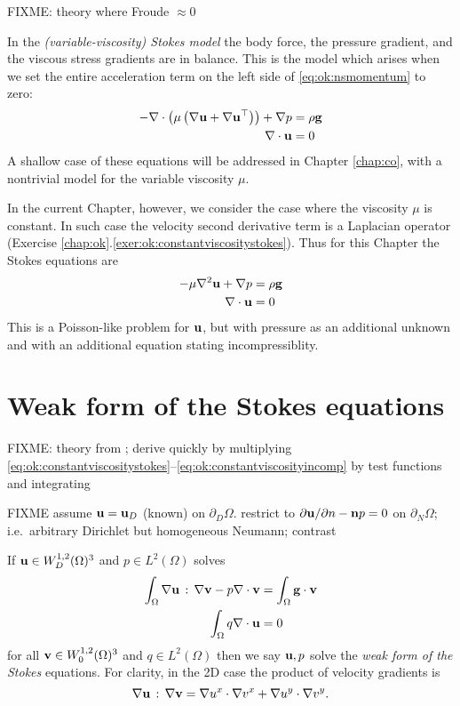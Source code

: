 FIXME: theory where Froude $\approx 0$

In the \emph{(variable-viscosity) Stokes model} the body force, the pressure gradient, and the viscous stress gradients are in balance.  This is the model which arises when we set the entire acceleration term on the left side of \eqref{eq:ok:nsmomentum} to zero:
\begin{align}
- \nabla\cdot \left(\mu \left(\nabla \mathbf{u} + \nabla \mathbf{u}^{\top}\right)\right) + \nabla p &= \rho \mathbf{g} \label{eq:ok:varstokesmomentum} \\
\nabla\cdot \mathbf{u} &= 0 \label{eq:ok:varstokesincomp}
\end{align}
A shallow case of these equations will be addressed in Chapter \ref{chap:co}, with a nontrivial model for the variable viscosity $\mu$.

In the current Chapter, however, we consider the case where the viscosity $\mu$ is constant.  In such case the velocity second derivative term is a Laplacian operator (Exercise \ref{chap:ok}.\ref{exer:ok:constantviscositystokes}).  Thus for this Chapter the Stokes equations are
\begin{align}
- \mu \nabla^2 \mathbf{u} + \nabla p &= \rho \mathbf{g}  \label{eq:ok:constantviscositystokes} \\
\nabla\cdot \mathbf{u} &= 0  \label{eq:ok:constantviscosityincomp}
\end{align}
This is a Poisson-like problem for $\mathbf{u}$, but with pressure as an additional unknown and with an additional equation stating incompressiblity.

\section{Weak form of the Stokes equations}

FIXME: theory from \citep{Braess2007,Elmanetal2005}; derive quickly by multiplying \eqref{eq:ok:constantviscositystokes}--\eqref{eq:ok:constantviscosityincomp} by test functions and integrating

FIXME assume $\mathbf{u}=\mathbf{u}_D$ (known) on $\partial_D\Omega$.  restrict to $\partial \mathbf{u}/\partial n - \mathbf{n} p = 0$ on $\partial_N\Omega$; i.e.~arbitrary Dirichlet but homogeneous Neumann; contrast \citep{Elmanetal2005}

If $\mathbf{u} \in W_D^{1,2}(\Omega)^3$ and $p \in L^2(\Omega)$ solves
\begin{align}
\int_\Omega \nabla \mathbf{u} \,:\, \nabla \mathbf{v} - p \nabla\cdot \mathbf{v} &= \int_\Omega \mathbf{g} \cdot \mathbf{v} \label{eq:ok:weakstokesvelocity} \\
\int_\Omega q \nabla\cdot \mathbf{u} &= 0 \label{eq:ok:weakstokespressure}
\end{align}
for all $\mathbf{v} \in W_0^{1,2}(\Omega)^3$ and $q \in L^2(\Omega)$ then we say $\mathbf{u},p$ solve the \emph{weak form of the Stokes} equations.  For clarity, in the 2D case the product of velocity gradients is
     $$\nabla \mathbf{u} \,:\, \nabla \mathbf{v} = \nabla u^x \cdot \nabla v^x + \nabla u^y \cdot \nabla v^y.$$


